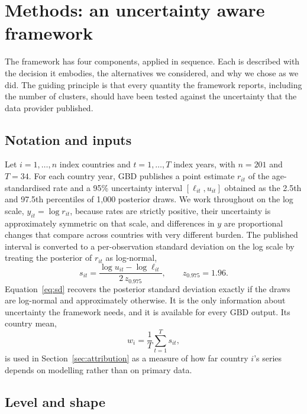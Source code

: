 \documentclass[11pt,a4paper]{article}
\begin{document}
\section{Methods: an uncertainty aware framework}\label{sec:methods}

The framework has four components, applied in sequence. Each is described with the decision it embodies, the alternatives we considered, and why we chose as we did. The guiding principle is that every quantity the framework reports, including the number of clusters, should have been tested against the uncertainty that the data provider published.

\subsection{Notation and inputs}

Let $i = 1, \ldots, n$ index countries and $t = 1, \ldots, T$ index years, with $n = 201$ and $T = 34$. For each country year, GBD publishes a point estimate $r_{it}$ of the age-standardised rate and a 95\% uncertainty interval $[\ell_{it}, u_{it}]$ obtained as the 2.5th and 97.5th percentiles of 1,000 posterior draws. We work throughout on the log scale, $y_{it} = \log r_{it}$, because rates are strictly positive, their uncertainty is approximately symmetric on that scale, and differences in $y$ are proportional changes that compare across countries with very different burden. The published interval is converted to a per-observation standard deviation on the log scale by treating the posterior of $r_{it}$ as log-normal,
\begin{equation}\label{eq:sd}
s_{it} = \frac{\log u_{it} - \log \ell_{it}}{2\, z_{0.975}}, \qquad z_{0.975} = 1.96.
\end{equation}
Equation~\eqref{eq:sd} recovers the posterior standard deviation exactly if the draws are log-normal and approximately otherwise. It is the only information about uncertainty the framework needs, and it is available for every GBD output. Its country mean,
\begin{equation}\label{eq:width}
w_i = \frac{1}{T}\sum_{t=1}^{T} s_{it},
\end{equation}
is used in Section~\ref{sec:attribution} as a measure of how far country $i$'s series depends on modelling rather than on primary data.

\subsection{Level and shape}
\end{document}
